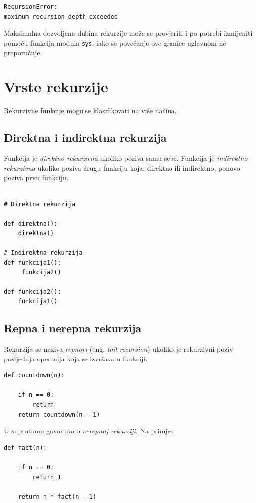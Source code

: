 \begin{verbatim}
RecursionError:
maximum recursion depth exceeded
\end{verbatim}

Maksimalna dozvoljena dubina rekurzije može se provjeriti i po potrebi izmijeniti pomoću funkcija modula \texttt{sys}, iako se povećanje ove granice uglavnom ne preporučuje.

\section{Vrste rekurzije}

Rekurzivne funkcije mogu se klasifikovati na više načina.

\subsection*{Direktna i indirektna rekurzija}

Funkcija je \textit{direktno rekurzivna} ukoliko poziva samu sebe. Funkcija je \textit{indirektno rekurzivna} ukoliko poziva drugu funkciju koja, direktno ili indirektno, ponovo poziva prvu funkciju.

\begin{verbatim}
	
# Direktna rekurzija

def direktna():
    direktna()

# Indirektna rekurzija
def funkcija1():
     funkcija2()

def funkcija2():
    funkcija1()
\end{verbatim}

\subsection*{Repna i nerepna rekurzija}

Rekurzija se naziva \textit{repnom} (eng. \textit{tail recursion}) ukoliko je rekurzivni poziv posljednja operacija koja se izvršava u funkciji.

\begin{verbatim}
def countdown(n):

    if n == 0:
        return
    return countdown(n - 1)
\end{verbatim}

U suprotnom govorimo o \textit{nerepnoj rekurziji}. Na primjer:

\begin{verbatim}
def fact(n):

    if n == 0:
        return 1

    return n * fact(n - 1)
\end{verbatim}

